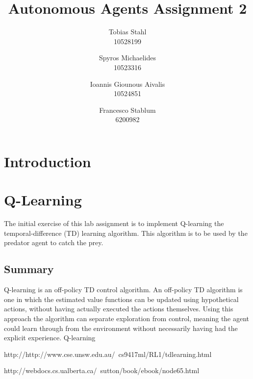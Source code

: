 \documentclass[11pt]{article}
\title{
	\textbf{Autonomous Agents Assignment 2}
}
\author{Tobias Stahl \\ 10528199 \and Spyros Michaelides \\ 10523316 \and Ioannis Giounous Aivalis \\ 10524851 \and Francesco Stablum \\ 6200982}
\begin{document}
\maketitle




\section{Introduction}



\section{Q-Learning}
The initial exercise of this lab assignment is to implement Q-learning the temporal-difference (TD) learning algorithm. This algorithm is to be used by the predator agent to catch the prey.



\subsection{Summary}
Q-learning is an off-policy TD control algorithm. An off-policy TD algorithm is one in which the estimated value functions can be updated using hypothetical actions, without having actually executed the actions themselves. Using this approach the algorithm can separate exploration from control, meaning the agent could learn through from the environment without necessarily having had the explicit experience.
Q-learning 


\begin{thebibliography}{2}

 http://http://www.cse.unsw.edu.au/~cs9417ml/RL1/tdlearning.html

 http://webdocs.cs.ualberta.ca/~sutton/book/ebook/node65.html


\end{thebibliography}
\end{document}
